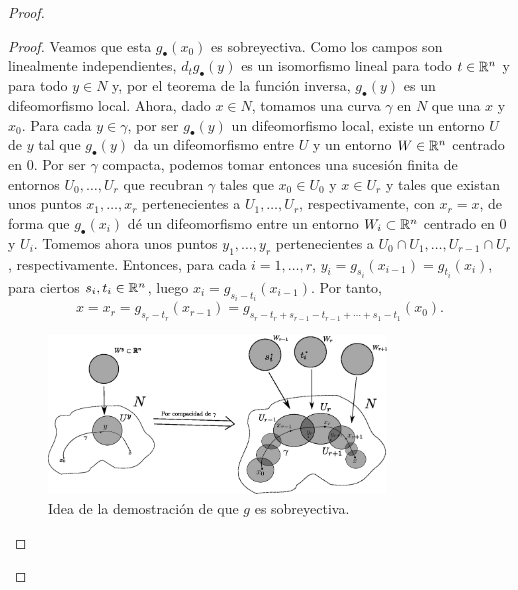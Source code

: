 \begin{proof}
\begin{proof}
Veamos que esta $g_\bullet(x_0)$ es sobreyectiva. Como los campos son linealmente independientes, $d_t g_\bullet(y)$ es un isomorfismo lineal para todo $t\in \mathbb{R}^n$ y para todo $y\in N$ y, por el teorema de la función inversa, $g_\bullet(y)$ es un difeomorfismo local. Ahora, dado $x\in N$, tomamos una curva $\gamma$ en $N$ que una $x$ y $x_0$. Para cada $y\in \gamma$, por ser $g_\bullet(y)$ un difeomorfismo local, existe un entorno $U$ de $y$ tal que $g_\bullet(y)$ da un difeomorfismo entre $U$ y un entorno $W\in \mathbb{R}^n$ centrado en $0$. Por ser $\gamma$ compacta, podemos tomar entonces una sucesión finita de entornos $U_0,\dots,U_r$ que recubran $\gamma$ tales que $x_0 \in U_0$ y $x \in U_r$ y tales que existan unos puntos $x_1,\dots,x_r$ pertenecientes a $U_1,\dots,U_r$, respectivamente, con $x_r=x$, de forma que $g_\bullet(x_i)$ dé un difeomorfismo entre un entorno $W_i\subset \mathbb{R}^n$ centrado en $0$ y $U_i$. Tomemos ahora unos puntos $y_1,\dots,y_{r}$ pertenecientes a $U_0\cap U_1,\dots,U_{r-1}\cap U_r$, respectivamente. Entonces, para cada $i=1,\dots,r$, $y_i=g_{s_i}(x_{i-1})=g_{t_i}(x_{i})$, para ciertos $s_i, t_i \in \mathbb{R}^n$, luego $x_{i}=g_{s_i-t_i}(x_{i-1})$. Por tanto, 
$$x=x_{r}=g_{s_{r}-t_{r}}(x_{r-1})=g_{s_{r}-t_{r}+s_{r-1}-t_{r-1}+\cdots+s_1-t_1}(x_0).$$ 

\begin{figure}[h]
  \centering
  \includegraphics[width=0.8\textwidth]{pics/entornos.eps}
  \caption{\small Idea de la demostración de que $g$ es sobreyectiva.}
  \label{fig:entornos}
\end{figure}


\end{proof}
\end{proof}
